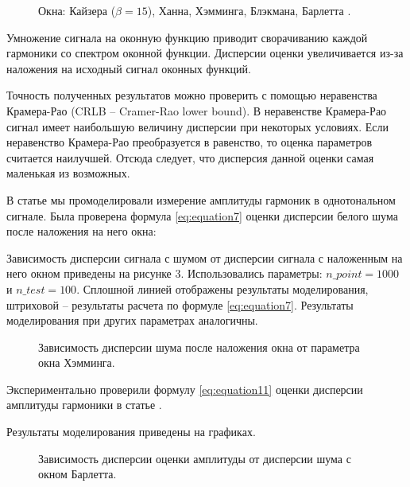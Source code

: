 \begin{figure}[p]
	\caption{Окна: Кайзера ($\beta=15$), Ханна, Хэмминга, Блэкмана, Барлетта .}\label{img:Windows}
\end{figure}
Умножение сигнала на оконную функцию приводит сворачиванию каждой гармоники со спектром оконной функции. Дисперсии оценки увеличивается из-за наложения на исходный сигнал оконных функций. 

Точность полученных результатов можно проверить с помощью неравенства Крамера-Рао (CRLB -- Cramer-Rao lower bound). В неравенстве Крамера-Рао сигнал имеет наибольшую величину дисперсии при некоторых условиях. Если неравенство Крамера-Рао преобразуется в равенство, то оценка параметров считается наилучшей. Отсюда следует, что дисперсия данной оценки самая маленькая из возможных.

В статье \cite{altman2020boundary} мы промоделировали измерение амплитуды гармоник в однотональном сигнале. Была проверена формула \ref{eq:equation7} оценки дисперсии белого шума после наложения на него окна:

Зависимость дисперсии сигнала с шумом от дисперсии сигнала с наложенным на него окном приведены на рисунке 3. Использовались параметры: $n\_point = 1000$ и $n\_test = 100$. Сплошной линией отображены результаты моделирования, штриховой -- результаты расчета по формуле \ref{eq:equation7}. Результаты моделирования при других параметрах аналогичны.


\begin{figure}[p]
	\caption{Зависимость дисперсии шума после наложения окна от параметра окна Хэмминга.}\label{img:noise_win_var_hamming}
\end{figure}

Экспериментально проверили формулу \ref{eq:equation11} оценки дисперсии амплитуды гармоники в статье \cite{altman2020boundary}.

Результаты моделирования приведены на графиках. 
\begin{figure}[p]
	\caption{Зависимость дисперсии оценки амплитуды от дисперсии шума с окном Барлетта.}\label{img:windows_barlett}
\end{figure}

